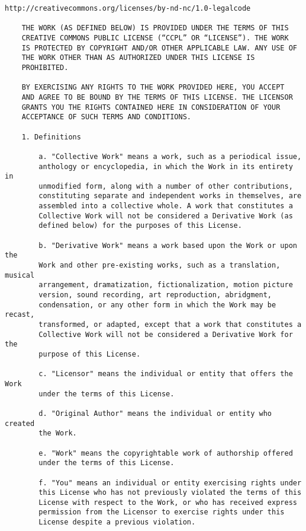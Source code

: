 \begin{Verbatim}[fontsize=\footnotesize]
    http://creativecommons.org/licenses/by-nd-nc/1.0-legalcode
    
    THE WORK (AS DEFINED BELOW) IS PROVIDED UNDER THE TERMS OF THIS
    CREATIVE COMMONS PUBLIC LICENSE (“CCPL” OR “LICENSE”). THE WORK
    IS PROTECTED BY COPYRIGHT AND/OR OTHER APPLICABLE LAW. ANY USE OF
    THE WORK OTHER THAN AS AUTHORIZED UNDER THIS LICENSE IS
    PROHIBITED.
    
    BY EXERCISING ANY RIGHTS TO THE WORK PROVIDED HERE, YOU ACCEPT
    AND AGREE TO BE BOUND BY THE TERMS OF THIS LICENSE. THE LICENSOR
    GRANTS YOU THE RIGHTS CONTAINED HERE IN CONSIDERATION OF YOUR
    ACCEPTANCE OF SUCH TERMS AND CONDITIONS.
    
    1. Definitions
    
        a. "Collective Work" means a work, such as a periodical issue,
        anthology or encyclopedia, in which the Work in its entirety in
        unmodified form, along with a number of other contributions,
        constituting separate and independent works in themselves, are
        assembled into a collective whole. A work that constitutes a
        Collective Work will not be considered a Derivative Work (as
        defined below) for the purposes of this License.
        
        b. "Derivative Work" means a work based upon the Work or upon the
        Work and other pre-existing works, such as a translation, musical
        arrangement, dramatization, fictionalization, motion picture
        version, sound recording, art reproduction, abridgment,
        condensation, or any other form in which the Work may be recast,
        transformed, or adapted, except that a work that constitutes a
        Collective Work will not be considered a Derivative Work for the
        purpose of this License.
        
        c. "Licensor" means the individual or entity that offers the Work
        under the terms of this License.
        
        d. "Original Author" means the individual or entity who created
        the Work.
        
        e. "Work" means the copyrightable work of authorship offered
        under the terms of this License.
        
        f. "You" means an individual or entity exercising rights under
        this License who has not previously violated the terms of this
        License with respect to the Work, or who has received express
        permission from the Licensor to exercise rights under this
        License despite a previous violation.
    

\end{Verbatim}
